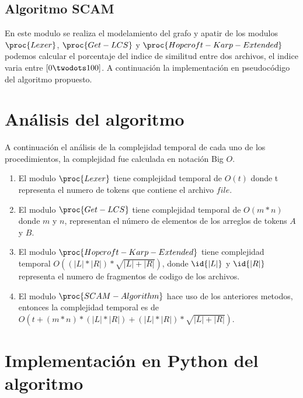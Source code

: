 \subsection{Algoritmo SCAM}
En este modulo se realiza el modelamiento del grafo y apatir de los modulos $\proc{Lexer}$, $\proc{Get-LCS}$ y $\proc{Hopcroft-Karp-Extended}$ podemos calcular el porcentaje del indice de similitud entre dos archivos, el indice varia entre $[0 \twodots 100]$. A continuación la implementación en pseudocódigo del algoritmo propuesto.




\section{Análisis del algoritmo}
A continuación el análisis de la complejidad temporal de cada uno de los procedimientos, la complejidad fue calculada en notación Big $O$.
\begin{enumerate}
  \item El modulo $\proc{Lexer}$ tiene complejidad temporal de $O(t)$ donde t representa el numero de tokens que contiene el archivo $file$.
  \item El modulo $\proc{Get-LCS}$ tiene complejidad temporal de $O(m*n)$ donde $m$ y $n$, representan el número de elementos de los arreglos de tokens $A$ y $B$.
  \item El modulo $\proc{Hopcroft-Karp-Extended}$ tiene complejidad temporal $O((|L|*|R|) * \sqrt{|L|+|R|})$, donde $\id{|L|}$ y $\id{|R|}$ representa el numero de fragmentos de codigo de los archivos.
  \item El modulo $\proc{SCAM-Algorithm}$ hace uso de los anteriores metodos, entonces la complejidad temporal es de $O(t + (m*n)*(|L|*|R|) + (|L|*|R|) * \sqrt{|L|+|R|})$.
\end{enumerate}

\section{Implementación en Python del algoritmo}
